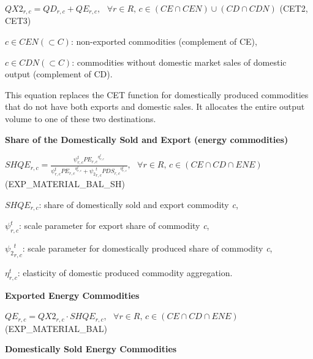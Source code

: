 \documentclass[10pt,a4paper,titlepage,dvipdfmx]{book}
\begin{document}
\begin{center}$QX2_{r,c}=QD_{r,c}+QE_{r,c},\,\,\,\,\forall r\in R,\,c\in \left(CE\cap CEN\right)\cup \left(CD\cap CDN\right)$ (CET2, CET3)
\end{center}

\begin{flushleft}
$c\in CEN\left(\subset C\right)$: non-exported commodities (complement of CE),

$c\in CDN\left(\subset C\right)$: commodities without domestic market sales of domestic output (complement of CD).
\end{flushleft}

This equation replaces the CET function for domestically produced commodities that do not have both exports and domestic sales. It allocates the entire output volume to one of these two destinations.

\begin{flushleft}\textbf{Share of the Domestically Sold and Export (energy commodities)}\end{flushleft}


\begin{center}$SHQE_{r,c}=\frac{\psi _{r,c}^{t}P{E_{r,c}}^{\eta _{r,c}^{t}}}{\psi _{r,c}^{t}P{E_{r,c}}^{\eta _{r,c}^{t}}+{\psi _{2}}_{r,c}^{t}PD{S_{r,c}}^{\eta _{r,c}^{t}}},\,\,\,\,\forall r\in R,\,c\in \left(CE\cap CD\cap ENE\right)$ (EXP\_MATERIAL\_BAL\_SH)
\end{center}

\begin{flushleft}
$SHQE_{r,c}$: share of domestically sold and export commodity \textit{c},

$\psi _{r,c}^{t}$: scale parameter for export share of commodity \textit{c}, 

${\psi _{2}}_{r,c}^{t}$: scale parameter for domestically produced share of commodity \textit{c}, 

$\eta _{r,c}^{t}$: elasticity of domestic produced commodity aggregation.
\end{flushleft}

\begin{flushleft}\textbf{Exported Energy Commodities}\end{flushleft}


\begin{center}$QE_{r,c}=QX2_{r,c}\cdot SHQE_{r,c},\,\,\,\,\forall r\in R,\,c\in \left(CE\cap CD\cap ENE\right)$ (EXP\_MATERIAL\_BAL)
\end{center}

\begin{flushleft}\textbf{Domestically Sold Energy Commodities}\end{flushleft}
\end{document}
